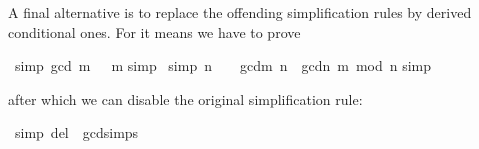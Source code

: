 \begin{isabelle}
\begin{isamarkuptext}
A final alternative is to replace the offending simplification rules by
derived conditional ones. For  it means we have to prove%
\end{isamarkuptext}%
\ {\isacharbrackleft}simp{\isacharbrackright}{\isacharcolon}\ {\isachardoublequote}gcd\ {\isacharparenleft}m{\isacharcomma}\ \ {\isacharequal}\ m{\isachardoublequote}\isanewline
{}simp{\isacharparenright}\isanewline
{}\ {\isacharbrackleft}simp{\isacharbrackright}{\isacharcolon}\ {\isachardoublequote}n\ {\isasymnoteq}\ \ {\isasymLongrightarrow}\ gcd{\isacharparenleft}m{\isacharcomma}\ n{\isacharparenright}\ {\isacharequal}\ gcd{\isacharparenleft}n{\isacharcomma}\ m\ mod\ n{\isacharparenright}{\isachardoublequote}\isanewline
{}simp{\isacharparenright}%
\begin{isamarkuptext}%
\noindent
after which we can disable the original simplification rule:%
\end{isamarkuptext}%
\ {\isacharbrackleft}simp\ del{\isacharbrackright}\ {\isacharequal}\ gcd{\isachardot}simps\isanewline
\end{isabelle}%
